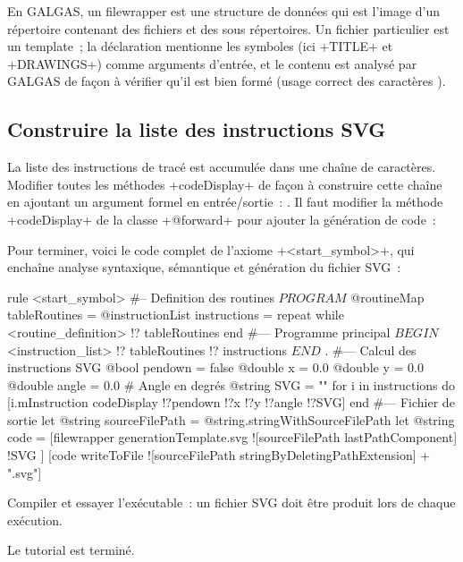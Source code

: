 En GALGAS, un filewrapper est une structure de données qui est l'image d'un répertoire contenant des fichiers et des sous répertoires. Un fichier particulier est un template~; la déclaration mentionne les symboles (ici \ggst+TITLE+ et \ggst+DRAWINGS+) comme arguments d'entrée, et le contenu est analysé par GALGAS de façon à vérifier qu'il est bien formé (usage correct des caractères \tpp{\%}).

\subsection{Construire la liste des instructions SVG}
La liste des instructions de tracé est accumulée dans une chaîne de caractères. Modifier toutes les méthodes \ggst+codeDisplay+ de façon à construire cette chaîne en ajoutant un argument formel en entrée/sortie~: . Il faut modifier la méthode \ggst+codeDisplay+ de la classe \ggst+@forward+ pour ajouter la génération de code~:


Pour terminer, voici le code complet de l’axiome \ggst+<start_symbol>+, qui enchaîne analyse syntaxique, sémantique et génération du fichier SVG~:
\begin{galgas3}
rule <start_symbol> {
#-- Definition des routines
  $PROGRAM$
  @routineMap tableRoutines = {}
  @instructionList instructions = {}
  repeat
  while
    <routine_definition> !? tableRoutines
  end
#--- Programme principal
  $BEGIN$
  <instruction_list> !? tableRoutines !? instructions
  $END$
  $.$
#--- Calcul des instructions SVG
  @bool pendown = false
  @double x = 0.0
  @double y = 0.0
  @double angle = 0.0 # Angle en degrés
  @string SVG = ""
  for i in instructions do
    [i.mInstruction codeDisplay !?pendown !?x !?y !?angle !?SVG]
  end
#--- Fichier de sortie
  let @string sourceFilePath = @string.stringWithSourceFilePath
  let @string code = [filewrapper generationTemplate.svg
    ![sourceFilePath lastPathComponent]
    !SVG
  ]
  [code writeToFile ![sourceFilePath stringByDeletingPathExtension] + ".svg"]
}
\end{galgas3}

Compiler et essayer l'exécutable~: un fichier SVG doit être produit lors de chaque exécution.

Le tutorial est terminé.
